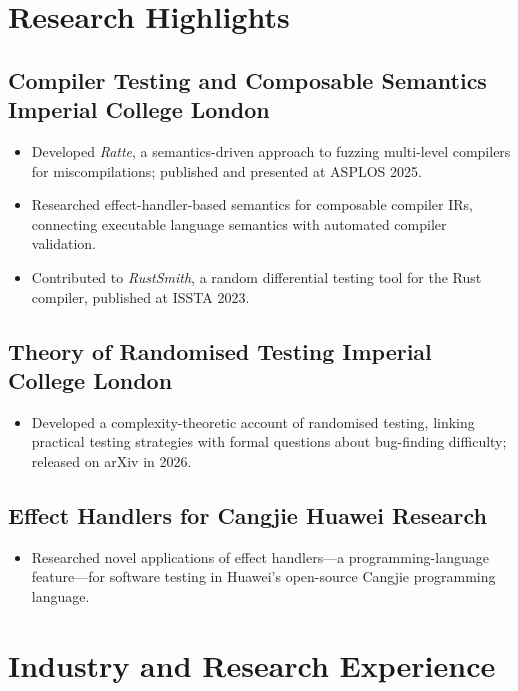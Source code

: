 \documentclass[10pt]{article}
\newcommand{\rside}[1]{\hfill {\normalfont\color{accent} #1}}
\begin{document}
\section{Research Highlights}

\subsection{Compiler Testing and Composable Semantics \rside{Imperial College London}}
\begin{itemize}
  \item Developed \textit{Ratte}, a semantics-driven approach to fuzzing multi-level compilers for miscompilations; published and presented at ASPLOS 2025.
  \item Researched effect-handler-based semantics for composable compiler IRs, connecting executable language semantics with automated compiler validation.
  \item Contributed to \textit{RustSmith}, a random differential testing tool for the Rust compiler, published at ISSTA 2023.
\end{itemize}

\subsection{Theory of Randomised Testing \rside{Imperial College London}}
\begin{itemize}
  \item Developed a complexity-theoretic account of randomised testing, linking practical testing strategies with formal questions about bug-finding difficulty; released on arXiv in 2026.
\end{itemize}

\subsection{Effect Handlers for Cangjie \rside{Huawei Research}}
\begin{itemize}
  \item Researched novel applications of effect handlers---a programming-language feature---for software testing in Huawei's open-source Cangjie programming language.
\end{itemize}

\section{Industry and Research Experience}
\end{document}
